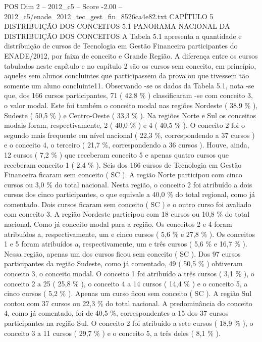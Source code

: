 \begin{textsample}{POS Dim 2 – 2012\_c5 – Score -2.00 – 2012\_c5/enade\_2012\_tec\_gest\_fin\_8526ca4e82.txt}  \label{ex:f2_pos_358}
CAPÍTULO 5 DISTRIBUIÇÃO DOS CONCEITOS 5.1 PANORAMA NACIONAL DA DISTRIBUIÇÃO DOS CONCEITOS A Tabela 5.1 apresenta a quantidade e distribuição de cursos de Tecnologia em Gestão Financeira participantes do ENADE/2012, por faixa de conceito e Grande Região.
A diferença entre os cursos tabulados neste capítulo e no capítulo 2 são os cursos sem conceito, em princípio, aqueles sem alunos concluintes que participassem da prova ou que tivessem tão somente um aluno concluinte11.
Observando -se os dados da Tabela 5.1, nota -se que, dos 166 cursos participantes, 71 ( 42,8 \% ) classificaram -se com conceito 3, o valor modal.
Este foi também o conceito modal nas regiões Nordeste ( 38,9 \% ), Sudeste ( 50,5 \% ) e Centro-Oeste ( 33,3 \% ).
Na regiões Norte e Sul os conceitos modais foram, respectivamente, 2 ( 40,0 \% ) e 4 ( 40,5 \% ).
O conceito 2 foi o segundo mais frequente em nível nacional ( 22,3 \%, correspondendo a 37 cursos ) e o conceito 4, o terceiro ( 21,7 \%, correspondendo a 36 cursos ).
Houve, ainda, 12 cursos ( 7,2 \% ) que receberam conceito 5 e apenas quatro cursos que receberam conceito 1 ( 2,4 \% ).
Seis dos 166 cursos de Tecnologia em Gestão Financeira ficaram sem conceito ( SC ).
A região Norte participou com cinco cursos ou 3,0 \% do total nacional.
Nesta região, o conceito 2 foi atribuído a dois cursos dos cinco participantes, o que equivale a 40,0 \% do total regional, como já comentado.
Dois cursos ficaram sem conceito ( SC ) e o outro curso foi avaliado com conceito 3.
A região Nordeste participou com 18 cursos ou 10,8 \% do total nacional.
Como já conceito modal para a região.
Os conceitos 2 e 4 foram atribuídos a, respectivamente, um e cinco cursos ( 5,6 \% e 27,8 \% ).
Os conceitos 1 e 5 foram atribuídos a, respectivamente, um e três cursos ( 5,6 \% e 16,7 \% ).
Nessa região, apenas um dos cursos ficou sem conceito ( SC ).
Dos 97 cursos participantes da região Sudeste, como já comentado, 49 ( 50,5 \% ) obtiveram conceito 3, o conceito modal.
O conceito 1 foi atribuído a três cursos ( 3,1 \% ), o conceito 2 a 25 ( 25,8 \% ), o conceito 4 a 14 cursos ( 14,4 \% ) e o conceito 5, a cinco cursos ( 5,2 \% ).
Apenas um curso ficou sem conceito ( SC ).
A região Sul contou com 37 cursos ou 22,3 \% do total nacional.
A predominância do conceito 4, como já comentado, foi de 40,5 \%, correspondentes a 15 dos 37 cursos participantes na região Sul.
O conceito 2 foi atribuído a sete cursos ( 18,9 \% ), o conceito 3 a 11 cursos ( 29,7 \% ) e o conceito 5, a três deles ( 8,1 \% ).

\end{textsample}
